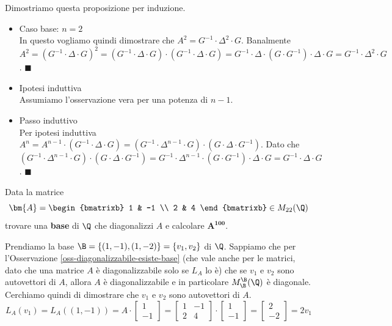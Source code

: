 \documentclass[11pt, a4paper, titlepage, oneside]{scrbook}
\begin{document}
Dimostriamo questa proposizione per induzione.
\begin{itemize}
    \item Caso base: $n = 2$ \\
    In questo vogliamo quindi dimostrare che  $A^2 = G^{-1} \cdot \Delta^2 \cdot G$. Banalmente \mbox{$A^2 = (G^{-1} \cdot \Delta \cdot G)^2 = (G^{-1} \cdot \Delta \cdot G) \cdot (G^{-1} \cdot \Delta \cdot G) = G^{-1} \cdot \Delta \cdot (G \cdot G^{-1}) \cdot \Delta \cdot G = G^{-1} \cdot \Delta^2 \cdot G$}. $\blacksquare$
    \item Ipotesi induttiva \\
    Assumiamo l'osservazione vera per una potenza di $n-1$.
    \item Passo induttivo \\
    Per ipotesi induttiva \mbox{$A^n  = A^{n-1} \cdot (G^{-1} \cdot \Delta \cdot G) = (G^{-1} \cdot \Delta^{n-1} \cdot G) \cdot (G \cdot \Delta \cdot G^{-1})$}. Dato che \mbox{$(G^{-1} \cdot \Delta^{n-1} \cdot G) \cdot (G \cdot \Delta \cdot G^{-1}) = G^{-1} \cdot \Delta^{n-1} \cdot (G \cdot G^{-1}) \cdot \Delta \cdot G = G^{-1} \cdot \Delta \cdot G$}. $\blacksquare$
\end{itemize}

\Esempio \nopagebreak

Data la matrice \nopagebreak
\[ \bm{A} = 
\begin{bmatrixb}
1 & -1  \\
2 & 4 
\end{bmatrixb} \in M_{22}(\Q)
\]
trovare una \textbf{base} di $\Q$ che diagonalizzi $A$ e calcolare $\bm{A^{100}}$. \nopagebreak

Prendiamo la base $\B = \{(1,-1), (1,-2)\} = \{v_1, v_2\}$ di $\Q$. Sappiamo che per l'Osservazione \ref{oss-diagonalizzabile-esiste-base} (che vale anche per le matrici, dato che una matrice $A$ è diagonalizzabile solo se $L_A$ lo è) che se $v_1$ e $v_2$ sono autovettori di $A$, allora $A$ è diagonalizzabile e in particolare $M_\B^\B(\Q)$ è diagonale. Cerchiamo quindi di dimostrare che $v_1$ e $v_2$ sono autovettori di $A$. 
\[L_A(v_1) = L_A((1,-1)) = A \cdot \begin{bmatrix}
        1 \\ -1
    \end{bmatrix} = \begin{bmatrix}
    1 & -1 \\
    2 & 4    
    \end{bmatrix} \cdot \begin{bmatrix}
        1 \\
        -1
    \end{bmatrix}
    =
    \begin{bmatrix}
        2 \\ -2
    \end{bmatrix}= 2 v_1 \]
\end{document}
